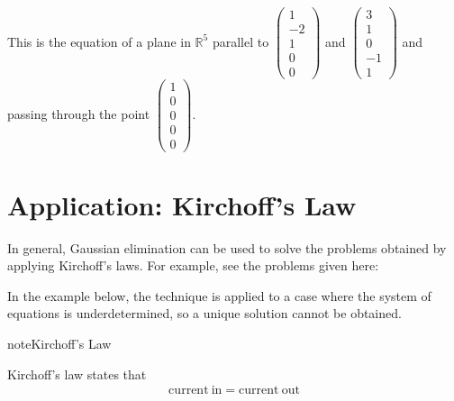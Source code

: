 \documentclass[letterpaper,10pt,english]{jupyterBook}
\begin{document}
This is the equation of a plane in \(\mathbb{R}^5\) parallel to \(\begin{pmatrix}1\\-2\\1\\0\\0\end{pmatrix}\) and \(\begin{pmatrix}3\\1\\0\\-1\\1\end{pmatrix}\) and passing through the point \(\begin{pmatrix}1\\0\\0\\0\\0\end{pmatrix}\).


\section{Application: Kirchoff’s Law}
\label{\detokenize{LinearAlgebra/problems/solutions_1:application-kirchoffs-law}}
\sphinxAtStartPar
In general, Gaussian elimination can be used to solve the problems obtained by applying Kirchoff’s laws. For example, see the problems given here:

\sphinxAtStartPar
{}

\sphinxAtStartPar
In the example below, the technique is applied to a case where the system of equations is under\sphinxhyphen{}determined, so a unique solution cannot be obtained.

\begin{sphinxadmonition}{note}{Kirchoff’s Law}

\sphinxAtStartPar
Kirchoff’s law states that
\begin{equation*}
\begin{split}\mathrm{current~in} = \mathrm{current~out}\end{split}
\end{equation*}\end{sphinxadmonition}
\end{document}
